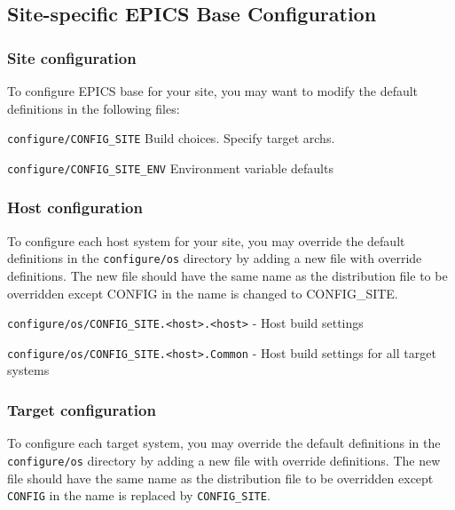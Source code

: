 \subsection{Site-specific EPICS Base Configuration}

\subsubsection{Site configuration}

To configure EPICS base for your site, you may want to modify the default definitions in the following files:

\begin{description}
\item {}\verb|configure/CONFIG_SITE| Build choices. Specify target archs.

\item {}\verb|configure/CONFIG_SITE_ENV| Environment variable defaults

\end{description}

\subsubsection{Host configuration}

To configure each host system for your site, you may override the default definitions in the \verb|configure/os| directory by 
adding a new file with override definitions. The new file should have the same name as the distribution file to be 
overridden except CONFIG in the name is changed to CONFIG\_SITE.

\begin{description}
\item {}\verb|configure/os/CONFIG_SITE.<host>.<host>| - Host build settings

\item {}\verb|configure/os/CONFIG_SITE.<host>.Common| - Host build settings for all target systems

\end{description}

\subsubsection{Target configuration}

To configure each target system, you may override the default definitions in the \verb|configure/os| directory by adding a new 
file with override definitions. The new file should have the same name as the distribution file to be overridden except 
\verb|CONFIG| in the name is replaced by \verb|CONFIG_SITE|.

